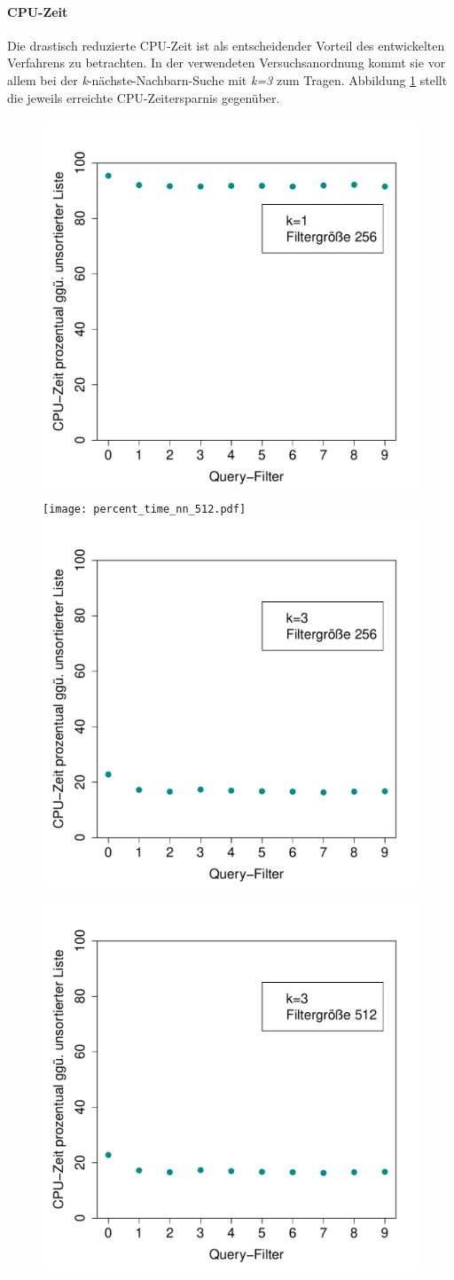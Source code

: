 \paragraph*{CPU-Zeit}
Die drastisch reduzierte CPU-Zeit ist als entscheidender Vorteil des entwickelten Verfahrens zu betrachten. In der verwendeten Versuchsanordnung kommt sie vor allem bei der \textit{k}-nächste-Nachbarn-Suche mit \textit{k=3} zum Tragen. Abbildung \ref{fig:zeitersparnis} stellt die jeweils erreichte CPU-Zeitersparnis gegenüber.
\begin{figure}[hpbt]
	\centering
	\label{fig:zeitersparnis}
	\includegraphics[width=0.48\linewidth]{pictures/percent_time_nn_256.pdf}
	\hspace{0.01\textwidth}
	\texttt{[image: percent\_time\_nn\_512.pdf]}\\[0pt] %
	\includegraphics[width=0.48\linewidth]{pictures/percent_time_nn3_256.pdf}
	\hspace{0.01\textwidth}
	\includegraphics[width=0.48\linewidth]{pictures/percent_time_nn3_512.pdf}
\end{figure}
